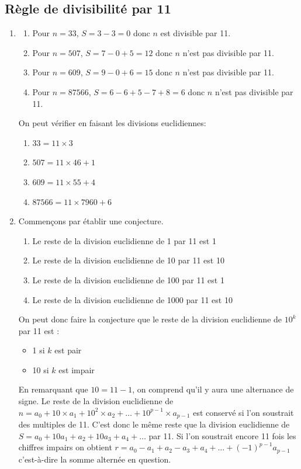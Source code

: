 \documentclass[a4paper,12pt, french, noSujetB]{article}
\begin{document}
\vspace{-3mm}
\subsection*{Règle de divisibilité par 11 }
\begin{enumerate}
	\item 
	\begin{enumerate}[label=(\roman*)]
		\item Pour $n=33$, $S=3-3=0$ donc $n$ est divisible par 11.
		\item Pour $n=507$, $S=7-0+5=12$ donc $n$ n'est pas divisible par 11.
		\item Pour $n=609$, $S=9-0+6=15$ donc $n$ n'est pas divisible par 11.
		\item Pour $n=87566$, $S=6-6+5-7+8=6$ donc $n$ n'est pas divisible par 11.
	\end{enumerate}
	
	On peut vérifier en faisant les divisions euclidiennes:
	\begin{enumerate}[label=(\roman*)]
		\item $33=11\times3$
		\item $507=11\times46+1$
		\item $609=11\times55+4$
		\item $87566=11\times7960+6$
	\end{enumerate}

	\item Commençons par établir une conjecture.
	\begin{enumerate}[label=(\roman*)]
		\item Le reste de la division euclidienne de 1 par 11 est 1
		\item Le reste de la division euclidienne de 10 par 11 est 10
		\item Le reste de la division euclidienne de 100 par 11 est 1
		\item Le reste de la division euclidienne de 1000 par 11 est 10
	\end{enumerate}

	On peut donc faire la conjecture que le reste de la division euclidienne de $10^k$ par 11 est :

	\begin{itemize}[label=*]
		\item 1 si $k$ est pair
		\item 10 si $k$ est impair
	\end{itemize}
	
	En remarquant que $10=11-1$, on comprend qu'il y aura une alternance de signe. Le reste de la division euclidienne de $n=a_0 + 10\times a_1  +10^2\times a_2+\dots+10^{p-1}\times a_{p-1}$ est conservé si l'on soustrait des multiples de 11. C'est donc le même reste que la division euclidienne de $S=a_0+10a_1+a_2+10a_3+a_4+\dots$ par 11. Si l'on soustrait encore 11 fois les chiffres impairs on obtient $r=a_0-a_1+a_2-a_3+a_4+\dots+(-1)^{p-1}a_{p-1}$ c'est-à-dire la somme alternée en question.


\end{enumerate}
\end{document}
